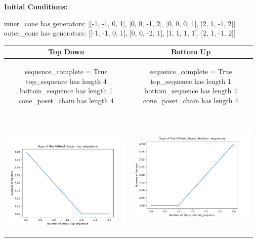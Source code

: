\documentclass[10pt]{article}
\begin{document}
\textbf{Initial Conditions:}
\begin{SAGE}
inner_cone has generators: 
[[-1, -1, 0, 1], [0, 0, -1, 2], [0, 0, 0, 1], [2, 1, -1, 2]]
outer_cone has generators: 
[[-1, -1, 0, 1], [0, 0, -2, 1], [1, 1, 1, 1], [2, 1, -1, 2]]

\end{SAGE}
\begin{tabular}{c|c}
\textbf{Top Down} & \textbf{Bottom Up} \\ \hline  
\begin{SAGE}
	sequence_complete = True
	top_sequence has length 4
	bottom_sequence has length 1
	cone_poset_chain has length 4
\end{SAGE} 
&
\begin{SAGE}
	sequence_complete = True
	top_sequence has length 1
	bottom_sequence has length 4
	cone_poset_chain has length 4
\end{SAGE} 
\\ \hline
\
\begin{minipage}{.45\textwidth}
\includegraphics[width=\textwidth]{"DATA/4d/4 generators 2 bound C/top_sequence SIZE"}
\end{minipage} &
\begin{minipage}{.45\textwidth}
\includegraphics[width=\textwidth]{"DATA/4d/4 generators 2 bound C bottomup/bottom_sequence SIZE"}

\end{minipage}
\end{tabular}
\end{document}
